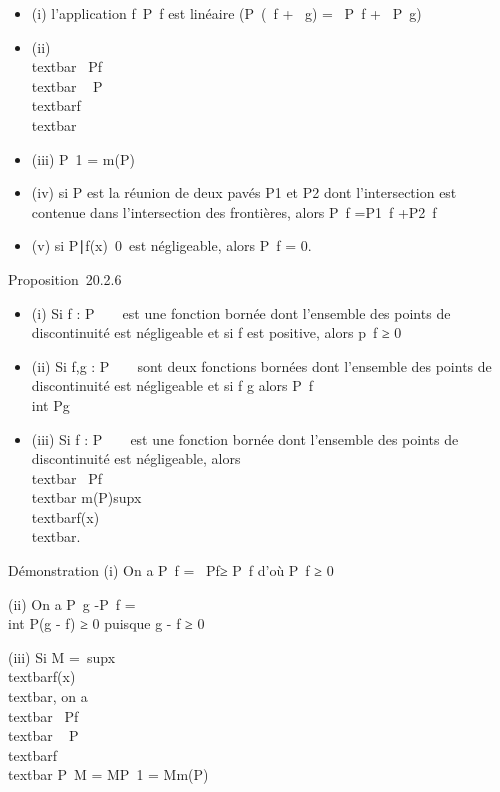 \begin{itemize}
\itemsep1pt\parskip0pt
\item
  (i) l'application
  f\mapsto~\int  P~f
  est linéaire (\int  P~(\alpha~f + \beta~g) =
  \alpha~\int  P~f +
  \beta~\int  P~g)
\item
  (ii) \\textbar{}\int ~
  Pf\\textbar{} \leq\int ~
  P\\textbar{}f\\textbar{}
\item
  (iii) \int  P~1 = m(P)
\item
  (iv) si P est la réunion de deux pavés P1 et P2
  dont l'intersection est contenue dans l'intersection des frontières,
  alors \int  P~f
  =\int  P1~f
  +\int  P2~f
\item
  (v) si \x \in
  P∣f(x)\mathrel\neq~0\
  est négligeable, alors \int  P~f = 0.
\end{itemize}

Proposition~20.2.6

\begin{itemize}
\itemsep1pt\parskip0pt
\item
  (i) Si f : P \rightarrow~ ~ est une fonction bornée dont l'ensemble des points de
  discontinuité est négligeable et si f est positive, alors
  \int  p~f ≥ 0
\item
  (ii) Si f,g : P \rightarrow~ ~ sont deux fonctions bornées dont l'ensemble des
  points de discontinuité est négligeable et si f \leq g alors
  \int  P~f \leq\\int
   Pg
\item
  (iii) Si f : P \rightarrow~ ~ est une fonction bornée dont l'ensemble des points
  de discontinuité est négligeable, alors
  \\textbar{}\int ~
  Pf\\textbar{} \leq
  m(P)supx\inP~\\textbar{}f(x)\\textbar{}.
\end{itemize}

Démonstration (i) On a \int  P~f
=\int ~
P\textbar{}f\textbar{}≥\left
\textbar{}\int  P~f\right
\textbar{} d'où \int  P~f ≥ 0

(ii) On a \int  P~g
-\int  P~f =\\int
 P(g - f) ≥ 0 puisque g - f ≥ 0

(iii) Si M =\
supx\inP\\textbar{}f(x)\\textbar{},
on a \\textbar{}\int ~
Pf\\textbar{} \leq\int ~
P\\textbar{}f\\textbar{}
\leq\int  P~M =
M\int  P~1 = Mm(P)

